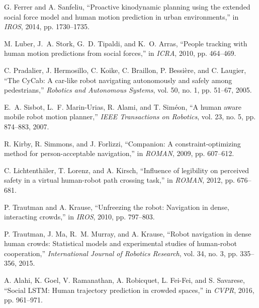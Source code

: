 \documentclass[12pt,a4paper,oneside]{book}
\begin{document}
\begin{enumerate}[label={[\arabic*]}, leftmargin=*]
\item \label{Ferrer2014} G. Ferrer and A. Sanfeliu, ``Proactive kinodynamic planning using the extended social force model and human motion prediction in urban environments,'' in \emph{IROS}, 2014, pp. 1730--1735.

\item \label{Luber2010} M. Luber, J.~A. Stork, G.~D. Tipaldi, and K.~O. Arras, ``People tracking with human motion predictions from social forces,'' in \emph{ICRA}, 2010, pp. 464--469.

\item \label{Pradalier2003} C. Pradalier, J. Hermosillo, C. Koike, C. Braillon, P. Bessière, and C. Laugier, ``The CyCab: A car-like robot navigating autonomously and safely among pedestrians,'' \emph{Robotics and Autonomous Systems}, vol. 50, no. 1, pp. 51--67, 2005.

\item \label{Sisbot2007} E.~A. Sisbot, L.~F. Marin-Urias, R. Alami, and T. Siméon, ``A human aware mobile robot motion planner,'' \emph{IEEE Transactions on Robotics}, vol. 23, no. 5, pp. 874--883, 2007.

\item \label{Kirby2009} R. Kirby, R. Simmons, and J. Forlizzi, ``Companion: A constraint-optimizing method for person-acceptable navigation,'' in \emph{ROMAN}, 2009, pp. 607--612.

\item \label{Lichtenthaler2012} C. Lichtenthäler, T. Lorenz, and A. Kirsch, ``Influence of legibility on perceived safety in a virtual human-robot path crossing task,'' in \emph{ROMAN}, 2012, pp. 676--681.

\item \label{Trautman2013} P. Trautman and A. Krause, ``Unfreezing the robot: Navigation in dense, interacting crowds,'' in \emph{IROS}, 2010, pp. 797--803.

\item \label{Trautman2015} P. Trautman, J. Ma, R.~M. Murray, and A. Krause, ``Robot navigation in dense human crowds: Statistical models and experimental studies of human-robot cooperation,'' \emph{International Journal of Robotics Research}, vol. 34, no. 3, pp. 335--356, 2015.

\item \label{Alahi2016} A. Alahi, K. Goel, V. Ramanathan, A. Robicquet, L. Fei-Fei, and S. Savarese, ``Social LSTM: Human trajectory prediction in crowded spaces,'' in \emph{CVPR}, 2016, pp. 961--971.


\end{enumerate}
\end{document}
